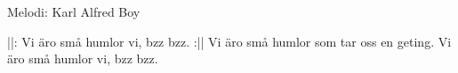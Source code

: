 \begin{song}

\begin{songmeta}
Melodi: Karl Alfred Boy
\end{songmeta}

\begin{songtext}
||: Vi äro små humlor vi, bzz bzz. :||
Vi äro små humlor
som tar oss en geting.
Vi äro små humlor vi, bzz bzz.
\end{songtext}
\end{song}
